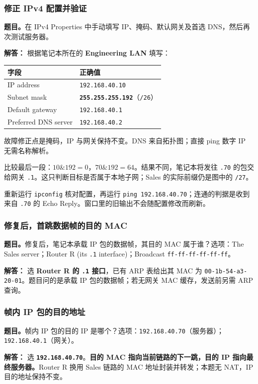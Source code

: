 \documentclass[11pt,a4paper,fontset=fandol]{ctexart}
\renewcommand{\exercisequestion}[2]{%
  \Needspace{5\baselineskip}%
  \subsubsection{#2}\label{exercise:#1}%
}
\renewenvironment{checkedsolution}
  {\par\nopagebreak[4]\textbf{解答：}\ignorespaces}
  {\par}
\begin{document}
\exercisequestion{SC2008-HW02-Q06}{修正 IPv4 配置并验证}
\textbf{题目。}在 IPv4 Properties 中手动填写 IP、掩码、默认网关及首选 DNS，然后再次测试服务器。
\begin{checkedsolution}
根据笔记本所在的 \textbf{Engineering LAN} 填写：
\begin{center}
\small
\begin{tabular}{@{}ll@{}}
\toprule
字段 & 正确值 \\
\midrule
IP address & \texttt{192.168.40.10} \\
Subnet mask & \textbf{\texttt{255.255.255.192}}（\texttt{/26}）\\
Default gateway & \texttt{192.168.40.1} \\
Preferred DNS server & \texttt{192.168.40.2} \\
\bottomrule
\end{tabular}
\end{center}
故障修正点是掩码，IP 与网关保持不变。DNS 来自拓扑图；直接 ping 数字 IP 无需名称解析。

比较最后一段：$10\mathbin{\&}192=0$，$70\mathbin{\&}192=64$。结果不同，笔记本将发往 \texttt{.70} 的包交给网关 \texttt{.1}。这只判断目标是否属于本地子网；Sales 的实际前缀仍是图中的 \texttt{/27}。

重新运行 \texttt{ipconfig} 核对配置，再运行 \texttt{ping 192.168.40.70}；连通的判据是收到来自 \texttt{.70} 的 Echo Reply。窗口里的旧输出不会随配置修改而刷新。
\end{checkedsolution}

\exercisequestion{SC2008-HW02-Q07}{修复后，首跳数据帧的目的 MAC}
\textbf{题目。}修复后，笔记本承载 IP 包的数据帧，其目的 MAC 属于谁？选项：The Sales server；Router R (its \texttt{.1} interface)；Broadcast \texttt{ff-ff-ff-ff-ff-ff}。
\begin{checkedsolution}
选 \textbf{Router R 的 \texttt{.1} 接口}，已有 ARP 表给出其 MAC 为 \texttt{00-1b-54-a3-20-01}。题目问的是承载 IP 包的数据帧；若无网关 MAC 缓存，发送前另需 ARP 查询。
\end{checkedsolution}

\exercisequestion{SC2008-HW02-Q08}{帧内 IP 包的目的地址}
\textbf{题目。}帧内 IP 包的目的 IP 是哪个？选项：\texttt{192.168.40.70}（服务器）；\texttt{192.168.40.1}（网关）。
\begin{checkedsolution}
选 \textbf{\texttt{192.168.40.70}}。\textbf{目的 MAC 指向当前链路的下一跳，目的 IP 指向最终服务器。}Router R 换用 Sales 链路的 MAC 地址封装并转发；本题无 NAT，IP 目的地址保持不变。
\end{checkedsolution}
\end{document}
